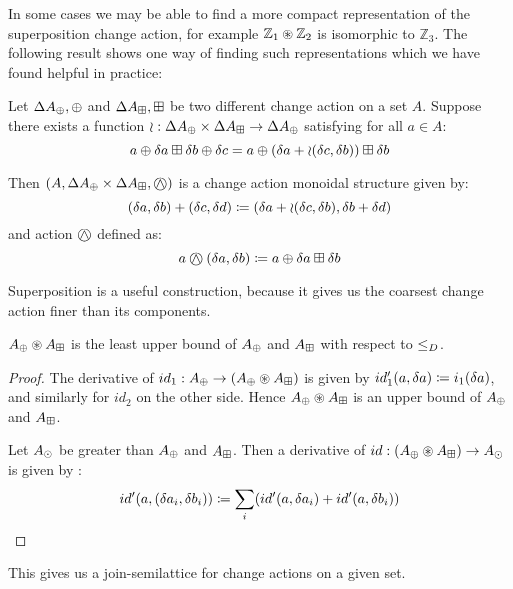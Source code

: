 In some cases we may be able to find a more compact representation of the
superposition change action, for example $\mathbb{Z}_1 \circledast \mathbb{Z}_2$ is 
isomorphic to $\mathbb{Z}_3$. The following result shows one way of finding such representations which
we have found helpful in practice:

\begin{prop}
  Let $\Delta A_\oplus, \oplus$ and $\Delta A_\boxplus, \boxplus$ be two different change action on
  a set $A$. Suppose there exists a function
  $\wr : \Delta A_\oplus \times \Delta A_\boxplus \rightarrow \Delta A_\oplus$ satisfying for
  all $a \in A$:
  $$
    a \oplus \delta a \boxplus \delta b \oplus \delta c
    = a \oplus (\delta a + \wr(\delta c,\delta b)) \boxplus \delta b
  $$

  Then $\cstruct{A}{\changes{A}_\cplus \times \changes{A}_\cpluss}{\cplussym{\wedge}}$
  is a change action monoidal structure given by:
  $$
    (\delta a, \delta b) + (\delta c, \delta d) \coloneqq 
    (\delta a + \wr(\delta c, \delta b), \delta b + \delta d)
  $$
  and action $\cplussym{\wedge}$ defined as:
  $$
    a \cplussym{\wedge} (\change{a}, \change{b}) \defeq a \cplus \change{a} \cpluss \change{b}
  $$
\end{prop}

Superposition is a useful construction, because it gives us the coarsest
change action finer than its components.

\begin{corollary}
  $A_\oplus \circledast A_\boxplus$ is the least upper bound of $A_\oplus$ and $A_\boxplus$ with respect to $\leq_D$.
\end{corollary}
\begin{proof}
  The derivative of $id_1: A_\oplus \rightarrow (A_\oplus \circledast
  A_\boxplus)$ is given by $id_1'(a, \delta a) \coloneqq 
  i_1(\delta a)$, and similarly for $id_2$ on the other side. Hence $A_\oplus \circledast A_\boxplus$ 
  is an upper bound of $A_\oplus$ and $A_\boxplus$.

  Let $A_\odot$ be greater than $A_\oplus$ and $A_\boxplus$.
  Then a
  derivative of $id: (A_\oplus \circledast A_\boxplus) \rightarrow A_\odot$ is
  given by :
  $$
  id'(a, (\delta a_i, \delta b_i)) \coloneqq 
    \sum_i (id'(a, \delta a_i) + id'(a, \delta b_i))
  $$
\end{proof}

This gives us a join-semilattice for change actions on a given set.

